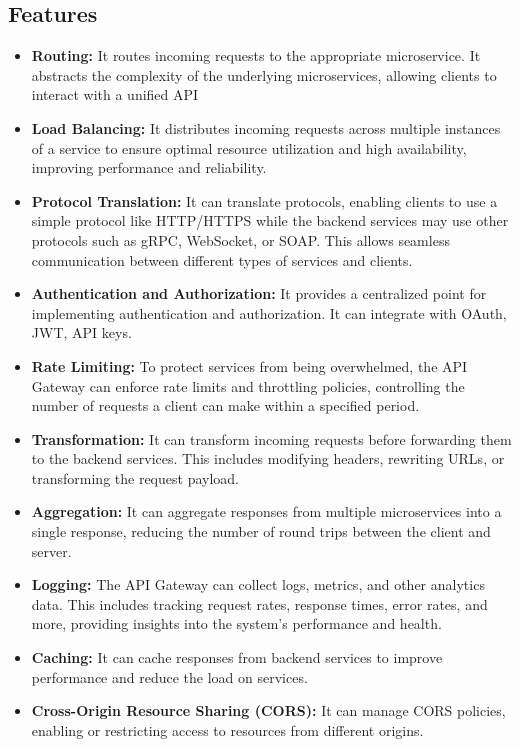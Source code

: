 \documentclass[a4paper, 12pt]{article}
\begin{document}
    \subsection{Features}
    \begin{itemize}
        \item \textbf{Routing: }It routes incoming requests to the appropriate microservice. It abstracts the complexity of the underlying microservices, allowing clients to interact with a unified API
        \item \textbf{Load Balancing: }It distributes incoming requests across multiple instances of a service to ensure optimal resource utilization and high availability, improving performance and reliability.
        \item \textbf{Protocol Translation: }It can translate protocols, enabling clients to use a simple protocol like HTTP/HTTPS while the backend services may use other protocols such as gRPC, WebSocket, or SOAP. This allows seamless communication between different types of services and clients.
        \item \textbf{Authentication and Authorization: }It provides a centralized point for implementing authentication and authorization. It can integrate with OAuth, JWT, API keys.
        \item \textbf{Rate Limiting: }To protect services from being overwhelmed, the API Gateway can enforce rate limits and throttling policies, controlling the number of requests a client can make within a specified period.
        \item \textbf{Transformation: } It can transform incoming requests before forwarding them to the backend services. This includes modifying headers, rewriting URLs, or transforming the request payload.
        \item \textbf{Aggregation: }It can aggregate responses from multiple microservices into a single response, reducing the number of round trips between the client and server.
        \item \textbf{Logging: }The API Gateway can collect logs, metrics, and other analytics data. This includes tracking request rates, response times, error rates, and more, providing insights into the system's performance and health.
        \item \textbf{Caching: }It can cache responses from backend services to improve performance and reduce the load on services.
        \item \textbf{Cross-Origin Resource Sharing (CORS): }It can manage CORS policies, enabling or restricting access to resources from different origins.

\end{itemize}
\end{document}
